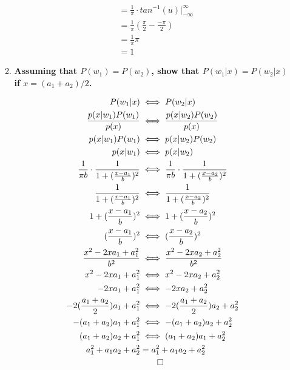 \documentclass[12pt]{article}
\begin{document}
\begin{enumerate}
\begin{enumerate}
\begin{figure}[H]
\begin{equation}
\begin{split}
      & = \frac{1}{\pi} \cdot tan^{-1}(u) |_{-\infty}^{\infty} \\
      & = \frac{1}{\pi} (\frac{\pi}{2} - \frac{-\pi}{2}) \\
      & = \frac{1}{\pi} \pi \\
      & \boxed{= 1}
    \end{split}
    \end{equation}
    \end{figure}
  \item \textbf{Assuming that $P(w_1) = P(w_2)$, show that $P(w_1|x) = P(w_2|x)$ if $x = (a_1 + a_2)/2$.}
    \begin{figure}[H]
    \begin{equation}
    \begin{split}
      P(w_1|x)& \iff P(w_2|x) \\
      \frac{p(x|w_1)P(w_1)}{p(x)}& \iff \frac{p(x|w_2)P(w_2)}{p(x)} \\
      p(x|w_1)P(w_1)& \iff p(x|w_2)P(w_2) \\
      p(x|w_1)& \iff p(x|w_2) \\
      \frac{1}{\pi b} \cdot \frac{1}{1 + (\frac{x-a_1}{b})^2}& \iff \frac{1}{\pi b} \cdot \frac{1}{1 + (\frac{x-a_2}{b})^2} \\
      \frac{1}{1 + (\frac{x-a_1}{b})^2}& \iff \frac{1}{1 + (\frac{x-a_2}{b})^2} \\
      1 + (\frac{x-a_1}{b})^2& \iff 1 + (\frac{x-a_2}{b})^2 \\
      (\frac{x-a_1}{b})^2& \iff (\frac{x-a_2}{b})^2 \\
      \frac{x^2-2xa_1+a_1^2}{b^2}& \iff \frac{x^2-2xa_2+a_2^2}{b^2} \\
      x^2-2xa_1+a_1^2& \iff x^2-2xa_2+a_2^2 \\
      -2xa_1+a_1^2& \iff -2xa_2+a_2^2 \\
      -2(\frac{a_1+a_2}{2})a_1 + a_1^2& \iff -2(\frac{a_1+a_2}{2})a_2 + a_2^2 \\
      -(a_1+a_2)a_1 + a_1^2& \iff -(a_1+a_2)a_2 + a_2^2 \\
      (a_1+a_2)a_2 + a_1^2& \iff (a_1+a_2)a_1 + a_2^2 \\
      a_1^2+ a_1a_2 + a_2^2 & = a_1^2+ a_1a_2 + a_2^2 \\
      & \qed
    \end{split}
    \end{equation}
    \end{figure}
  \end{enumerate}

\end{enumerate}
 
\end{document}
